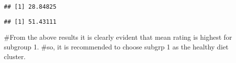 \documentclass[
]{article}
\newenvironment{Shaded}{\begin{snugshade}}{\end{snugshade}}
\newcommand{\DecValTok}[1]{\textcolor[rgb]{0.00,0.00,0.81}{#1}}
\newcommand{\FunctionTok}[1]{\textcolor[rgb]{0.00,0.00,0.00}{#1}}
\newcommand{\NormalTok}[1]{#1}
\newcommand{\SpecialCharTok}[1]{\textcolor[rgb]{0.00,0.00,0.00}{#1}}
\newcommand{\StringTok}[1]{\textcolor[rgb]{0.31,0.60,0.02}{#1}}
\begin{document}
\begin{verbatim}
## [1] 28.84825
\end{verbatim}

\begin{Shaded}
\end{Shaded}

\begin{verbatim}
## [1] 51.43111
\end{verbatim}

\#From the above results it is clearly evident that mean rating is
highest for subgroup 1. \#so, it is recommended to choose subgrp 1 as
the healthy diet cluster.
\end{document}
